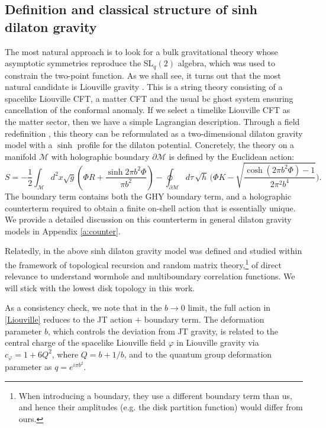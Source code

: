 \documentclass[a4paper,titlepage,12pt]{article}
\numberwithin{equation}{section}
\begin{document}
\subsection{Definition and classical structure of sinh dilaton gravity}
\label{s:classical}
The most natural approach is to look for a bulk gravitational theory whose asymptotic symmetries reproduce the SL$_q(2)$ algebra, which was used to constrain the two-point function. As we shall see, it turns out that the most natural candidate is Liouville gravity \cite{Polyakov:1981rd,Distler:1988jt,David:1988hj,Knizhnik:1988ak}. This is a string theory consisting of a spacelike Liouville CFT, a matter CFT and the usual bc ghost system ensuring cancellation of the conformal anomaly. If we select a timelike Liouville CFT as the matter sector, then we have a simple Lagrangian description. Through a field redefinition \cite{Kyono:2017pxs,Mertens:2020hbs,Fan:2021bwt}, this theory can be reformulated as a two-dimensional dilaton gravity model with a $\sinh$ profile for the dilaton potential. Concretely, the theory on a manifold $\mathcal{M}$ with holographic boundary $\partial \mathcal{M}$ is defined by the Euclidean action:
\begin{equation}\label{Liouville}
S = -\frac{1}{2} \int_\mathcal{M} d^2x \sqrt{g}\left(\Phi R + \frac{\sinh 2\pi b^2 \Phi}{\pi b^2}\right) - \oint_{\partial \mathcal{M}} d \tau\,\sqrt{h}\,\bigg(\Phi K-\sqrt{\frac{\cosh(2\pi b^2 \Phi)-1}{2\pi^2 b^4}}\bigg).
\end{equation}
The boundary term contains both the GHY boundary term, and a holographic counterterm required to obtain a finite on-shell action that is essentially unique. We provide a detailed discussion on this counterterm in general dilaton gravity models in Appendix \ref{a:counter}.

Relatedly, in \cite{Collier:2023cyw} the above sinh dilaton gravity model was defined and studied within the framework of topological recursion and random matrix theory,\footnote{When introducing a boundary, they use a different boundary term than us, and hence their amplitudes (e.g. the disk partition function) would differ from ours.} of direct relevance to understand wormhole and multiboundary correlation functions. We will stick with the lowest disk topology in this work.

As a consistency check, we note that in the $b \rightarrow 0$ limit, the full action in \eqref{Liouville} reduces to the JT action $+$ boundary term. The deformation parameter $b$, which controls the deviation from JT gravity, is related to the central charge of the spacelike Liouville field $\varphi$ in Liouville gravity via $c_{\varphi} = 1 + 6Q^2$, where $Q = b + 1/b$, and to the quantum group deformation parameter as $q=e^{i \pi b^2}$.
\end{document}
